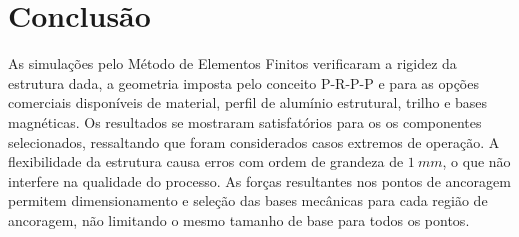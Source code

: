 \section{Conclusão}

As simulações pelo Método de Elementos Finitos verificaram a rigidez da
estrutura dada, a geometria imposta pelo conceito P-R-P-P e para as opções
comerciais disponíveis de material, perfil de alumínio estrutural, trilho e bases
magnéticas.
Os resultados se mostraram satisfatórios para os os componentes selecionados,
ressaltando que foram considerados casos extremos de operação. A flexibilidade
da estrutura causa erros com ordem de grandeza de $1~mm$, o que não interfere na
qualidade do processo.
As forças resultantes nos pontos de ancoragem permitem dimensionamento e seleção
das bases mecânicas para cada região de ancoragem, não limitando o mesmo tamanho
de base para todos os pontos.
